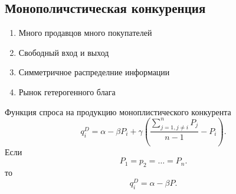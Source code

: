 \documentclass[14pt]{extarticle}
\begin{document}
\subsection{Монополичстическая конкуренция}
\begin{enumerate}
    \item Много продавцов много покупателей
    \item Свободный вход и выход
    \item Симметричное распределние информации
    \item Рынок гетерогенного блага
\end{enumerate}
Функция спроса на продукцию моноплистического конкурента
\[
q_{i}^{D} = \alpha - \beta P_{i} + \gamma ( \frac{\sum_{j=1,j\neq i}^{n} P_{j}}{n - 1} - P_{i})
.\] 
Если
\[
    P_1 = p_2 = \dots = P_{n}
.\] 
то 
\[
q_{i}^{D} = \alpha - \beta P
.\] 
\end{document}
